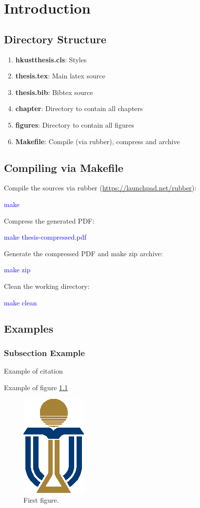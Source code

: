 \chapter{Introduction}
\section{Directory Structure}
\begin{enumerate}
    \item {\bf hkustthesis.cls}: Styles
    \item {\bf thesis.tex}: Main latex source
    \item {\bf thesis.bib}: Bibtex source
    \item {\bf chapter}: Directory to contain all chapters
    \item {\bf figures}: Directory to contain all figures
    \item {\bf Makefile}: Compile (via rubber), compress and archive
\end{enumerate}

\section{Compiling via Makefile}
Compile the sources via rubber (\url{https://launchpad.net/rubber}):

\textcolor{blue}{make}

Compress the generated PDF:

\textcolor{blue}{make thesis-compressed.pdf}

Generate the compressed PDF and make zip archive:

\textcolor{blue}{make zip}

Clean the working directory:

\textcolor{blue}{make clean}

\section{Examples}
\subsection{Subsection Example}
Example of citation \cite{citationkey}

Example of figure \ref{figure:figure_example}
\begin{figure}[h]
    \centering
    \includegraphics{figures/figures-logo.eps}
    \caption{First figure.}
    \label{figure:figure_example}
\end{figure}


